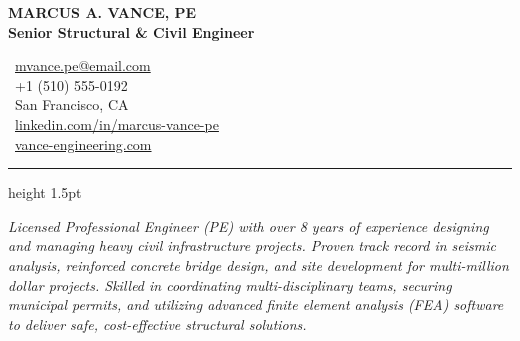 \documentclass[10pt]{article}
\begin{document}
\color{dark}

\begin{minipage}[b]{0.55\textwidth}
  \raggedright
  {\Huge\color{primary}\bfseries MARCUS A. VANCE, PE} \\[4pt]
  {\large\color{secondary}\bfseries Senior Structural \& Civil Engineer}
\end{minipage}%
\begin{minipage}[b]{0.45\textwidth}
  \raggedleft\small
  \faEnvelope~\href{mailto:mvance.pe@email.com}{mvance.pe@email.com} \\
  \faPhone~+1 (510) 555-0192 \\
  \faMapMarker~San Francisco, CA \\
  \faLinkedin~\href{https://linkedin.com/in/marcus-vance-pe}{linkedin.com/in/marcus-vance-pe} \\
  \faGlobe~\href{https://vance-engineering.com}{vance-engineering.com}
\end{minipage}

\vspace{8pt}
{\color{secondary}\hrule height 1.5pt}
\vspace{8pt}

{\color{dark}\itshape
  Licensed Professional Engineer (PE) with over 8 years of experience designing and managing heavy civil infrastructure projects. Proven track record in seismic analysis, reinforced concrete bridge design, and site development for multi-million dollar projects. Skilled in coordinating multi-disciplinary teams, securing municipal permits, and utilizing advanced finite element analysis (FEA) software to deliver safe, cost-effective structural solutions.
}

\vspace{6pt}
\end{document}
